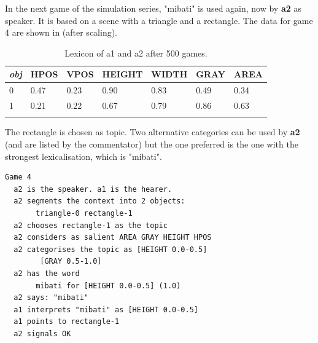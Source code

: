 In the next game of the simulation series, "mibati"
is used again, now by {\bf a2} as speaker. It is 
based on a scene with a triangle and a rectangle.
The data for game 4 are shown in  (after scaling).  
\begin{table}
\begin{center}
\begin{tabular}{ l  l  l  l  l  l  l }
\lsptoprule
{\it obj} & HPOS & VPOS & HEIGHT & WIDTH & GRAY & AREA \\ \midrule
0 & 0.47 & 0.23 & 0.90 & 0.83 & 0.49 & 0.34\\ \midrule
1 & 0.21 & 0.22 & 0.67 & 0.79 & 0.86 & 0.63\\ \midrule
\lspbottomrule
\end{tabular}
\caption{\label{tab:mibati} Lexicon of a1 and a2 after 500 games.}
\end{center}
\end{table}
The rectangle is chosen as topic. Two alternative
categories can be used by {\bf a2} (and are listed
by the commentator) but the one preferred
is the one with the strongest lexicalisation, which is 
"mibati".
\begin{verbatim}
Game 4
  a2 is the speaker. a1 is the hearer. 
  a2 segments the context into 2 objects: 
       triangle-0 rectangle-1
  a2 chooses rectangle-1 as the topic 
  a2 considers as salient AREA GRAY HEIGHT HPOS 
  a2 categorises the topic as [HEIGHT 0.0-0.5] 
        [GRAY 0.5-1.0]
  a2 has the word
       mibati for [HEIGHT 0.0-0.5] (1.0)
  a2 says: "mibati"
  a1 interprets "mibati" as [HEIGHT 0.0-0.5]
  a1 points to rectangle-1
  a2 signals OK 
\end{verbatim}

